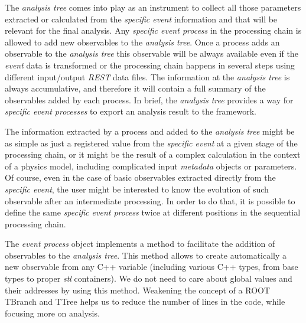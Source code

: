 The \emph{analysis tree} comes into play as an instrument to collect all those parameters extracted or calculated from the \emph{specific event} information and that will be relevant for the final analysis.  Any \emph{specific event process} in the processing chain is allowed to add new observables to the \emph{analysis tree}. Once a process adds an observable to the \emph{analysis tree} this observable will be always available even if the \emph{event} data is transformed or the processing chain happens in several steps using different input/output \emph{REST} data files. The information at the \emph{analysis tree} is always accumulative, and therefore it will contain a full summary of the observables added by each process.
In brief, the \emph{analysis tree} provides a way for \emph{specific event processes} to export an analysis result to the framework.

The information extracted by a process and added to the \emph{analysis tree} might be as simple as just a registered value from the \emph{specific event} at a given stage of the processing chain, or it might be the result of a complex calculation in the context of a physics model, including complicated input \emph{metadata} objects or parameters. Of course, even in the case of basic observables extracted directly from the \emph{specific event}, the user might be interested to know the evolution of such observable after an intermediate processing. In order to do that, it is possible to define the same \emph{specific event process} twice at different positions in the sequential processing chain.





The \emph{event process} object implements a method to facilitate the addition of observables to the \emph{analysis tree}. This method allows to create automatically a new observable from any C++ variable (including various C++ types, from base types to proper \emph{stl} containers). We do not need to care about global values and their addresses by using this method. Weakening the concept of a ROOT TBranch and TTree helps us to reduce the number of lines in the code, while focusing more on analysis.

